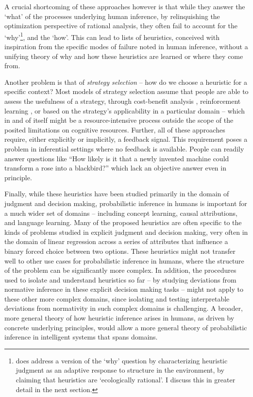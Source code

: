 A crucial shortcoming of these approaches however is that while they answer the `what' of the processes underlying human inference, by relinquishing the optimization perspective of rational analysis, they often fail to account for the `why'\footnote{\citet{gigerenzer2008heuristics} does address a version of the `why' question by characterizing heuristic judgment as an adaptive response to structure in the environment, by claiming that heuristics are `ecologically rational'. I discuss this in greater detail in the next section.}, and the `how'. This can lead to lists of heuristics, conceived with inspiration from the specific modes of failure noted in human inference, without a unifying theory of why and how these heuristics are learned or where they come from. 

Another problem is that of \emph{strategy selection} \citep{gigerenzer2008heuristics, marewski2014strategy} -- how do we choose a heuristic for a specific context? Most models of strategy selection assume that people are able to assess the usefulness of a strategy, through cost-benefit analysis \citep{johnson85, beach1978contingency, lieder2017strategy}, reinforcement learning \citep{erev05, rieskamp06}, or based on the strategy's applicability in a particular domain \citep{marewski2011cognitive, schulz2016simple} -- which in and of itself might be a resource-intensive process outside the scope of the posited limitations on cognitive resources. Further, all of these approaches require, either explicitly or implicitly, a feedback signal. This requirement poses a problem in inferential settings where no feedback is available. People can readily answer questions like ``How likely is it that a newly invented machine could transform a rose into a blackbird?'' \citep{Griffiths15} which lack an objective answer even in principle. 

Finally, while these heuristics have been studied primarily in the domain of judgment and decision making, probabilistic inference in humans is important for a much wider set of domains -- including concept learning, causal attributions, and language learning. Many of the proposed heuristics are often specific to the kinds of problems studied in explicit judgment and decision making, very often in the domain of linear regression across a series of attributes that influence a binary forced choice between two options\citep{czerlinski1999good, csimcsek2015learning}. These heuristics might not transfer well to other use cases for probabilistic inference in humans, where the structure of the problem can be significantly more complex. In addition, the procedures used to isolate and understand heuristics so far -- by studying deviations from normative inference in these explicit decision making tasks -- might not apply to these other more complex domains, since isolating and testing interpretable deviations from normativity in such complex domains is challenging. A broader, more general theory of how heuristic inference arises in humans, as driven by concrete underlying principles, would allow a more general theory of probabilistic inference in intelligent systems that spans domains.

